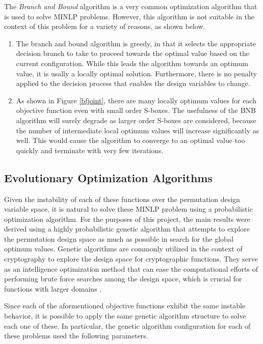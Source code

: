 \documentclass[11pt]{article}
\begin{document}
The \emph{Branch and Bound} algorithm is a very common optimization algorithm that is used to solve MINLP problems. However, this algorithm is not suitable in the context of this problem for a variety of reasons, as shown below.

\begin{enumerate}
	\item The branch and bound algorithm is greedy, in that it selects the appropriate decision branch to take to proceed towards the optimal value based on the current configuration. While this leads the algorithm towards an optimum value, it is usally a locally optimal solution. Furthermore, there is no penalty applied to the decision process that enables the design variables to change. 
	\item As shown in Figure \ref{bfjoint}, there are many locally optimum values for each objective function even with small order S-boxes. The usefulness of the BNB algorithm will surely degrade as larger order S-boxes are considered, because the number of intermediate local optimum values will increase significantly as well. This would cause the algorithm to converge to an optimal value too quickly and terminate with very few iterations. 
\end{enumerate}


\subsection{Evolutionary Optimization Algorithms}

Given the instability of each of these functions over the permutation design variable space, it is natural to solve these MINLP problem using a probabilistic optimization algorithm. For the purposes of this project, the main results were derived using a highly probabilistic genetic algorithm that attempts to explore the permutation design space as much as possible in search for the global optimum values. Genetic algorithms are commonly utilized in the context of cryptography to explore the design space for cryptographic functions. They serve as an intelligence optimization method that can ease the computational efforts of performing brute force searches among the design space, which is crucial for functions with larger domains \cite{Skein}.

Since each of the aformentioned objective functions exhibit the same instable behavior, it is possible to apply the same genetic algorithm structure to solve each one of these. In particular, the genetic algorithm configuration for each of these problems used the following parameters.
\end{document}
